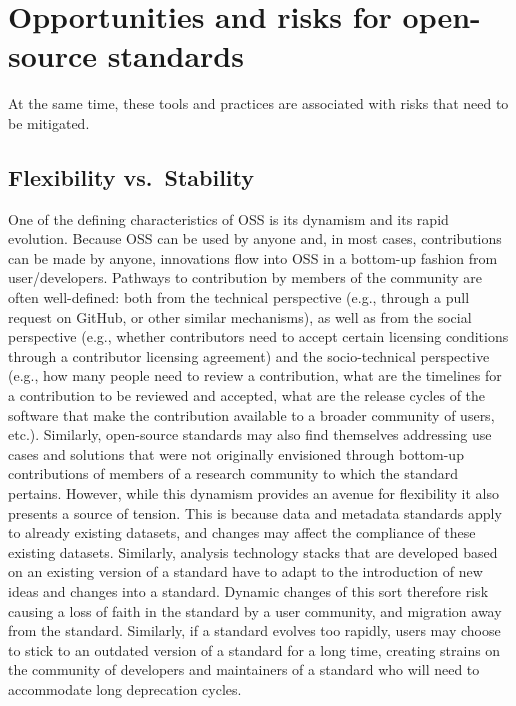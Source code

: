 \documentclass[
  letterpaper,
  DIV=11,
  numbers=noendperiod]{scrartcl}
\begin{document}
\section{Opportunities and risks for open-source
standards}\label{sec-challenges}

At the same time, these tools and practices are associated with risks
that need to be mitigated.

\subsection{Flexibility vs.~Stability}\label{flexibility-vs.-stability}

One of the defining characteristics of OSS is its dynamism and its rapid
evolution. Because OSS can be used by anyone and, in most cases,
contributions can be made by anyone, innovations flow into OSS in a
bottom-up fashion from user/developers. Pathways to contribution by
members of the community are often well-defined: both from the technical
perspective (e.g., through a pull request on GitHub, or other similar
mechanisms), as well as from the social perspective (e.g., whether
contributors need to accept certain licensing conditions through a
contributor licensing agreement) and the socio-technical perspective
(e.g., how many people need to review a contribution, what are the
timelines for a contribution to be reviewed and accepted, what are the
release cycles of the software that make the contribution available to a
broader community of users, etc.). Similarly, open-source standards may
also find themselves addressing use cases and solutions that were not
originally envisioned through bottom-up contributions of members of a
research community to which the standard pertains. However, while this
dynamism provides an avenue for flexibility it also presents a source of
tension. This is because data and metadata standards apply to already
existing datasets, and changes may affect the compliance of these
existing datasets. Similarly, analysis technology stacks that are
developed based on an existing version of a standard have to adapt to
the introduction of new ideas and changes into a standard. Dynamic
changes of this sort therefore risk causing a loss of faith in the
standard by a user community, and migration away from the standard.
Similarly, if a standard evolves too rapidly, users may choose to stick
to an outdated version of a standard for a long time, creating strains
on the community of developers and maintainers of a standard who will
need to accommodate long deprecation cycles.
\end{document}
